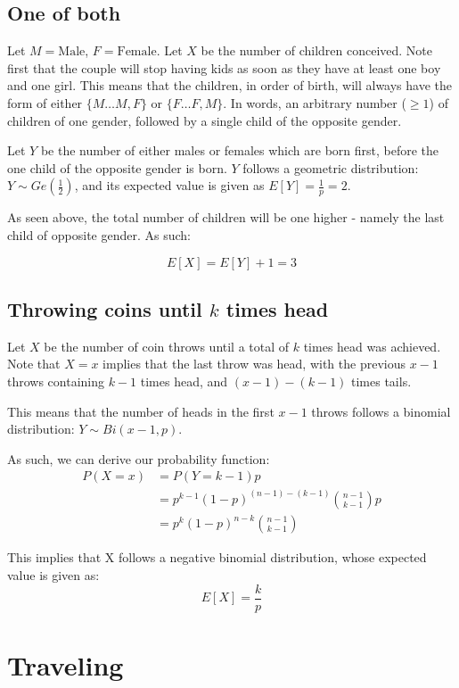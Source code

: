 \documentclass[a4paper]{scrreprt}
\begin{document}
\subsection{One of both}

Let $M = \text{Male}$, $F = \text{Female}$. Let $X$ be the number of children
conceived. Note first that the couple will stop having kids as soon as they
have at least one boy and one girl. This means that the children, in order of
birth, will always have the form of either $\{M \ldots M, F\}$ or $\{F \ldots
F, M\}$. In words, an arbitrary number ($\geq 1$) of children of one gender,
followed by a single child of the opposite gender.

Let $Y$ be the number of either males or females which are born first, before
the one child of the opposite gender is born. $Y$ follows a geometric
distribution: $Y \sim Ge\left(\frac{1}{2}\right)$, and its expected value is
given as $E[Y] = \frac{1}{p} = 2$.

As seen above, the total number of children will be one higher - namely the
last child of opposite gender. As such:

\[
	E[X] = E[Y] + 1 = 3
\]

\subsection{Throwing coins until $k$ times head}

Let $X$ be the number of coin throws until a total of $k$ times head was
achieved. Note that $X=x$ implies that the last throw was head, with the
previous $x-1$ throws containing $k-1$ times head, and $(x-1)-(k-1)$ times
tails.

This means that the number of heads in the first $x-1$ throws follows a
binomial distribution: $Y \sim Bi(x-1, p)$.

As such, we can derive our probability function:
\begin{align*}
	P(X=x) & = P(Y = k-1) p \\
	       & = p^{k-1} (1-p)^{(n-1) - (k-1)} \binom{n-1}{k-1} p \\
	       & = p^k (1-p)^{n-k} \binom{n-1}{k-1}
\end{align*}

This implies that X follows a negative binomial distribution, whose expected value is given as:
\[
	E[X] = \frac{k}{p}
\]

\section{Traveling}
\end{document}
